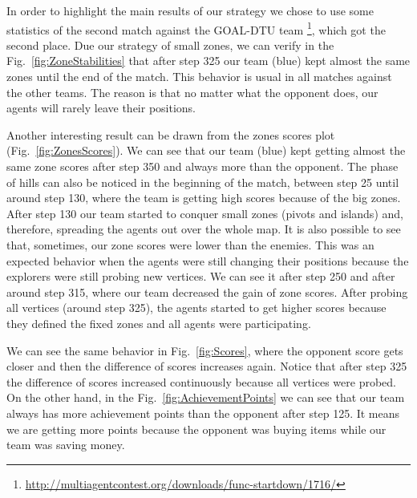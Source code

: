In order to highlight the main results of our strategy we chose to use some statistics of the second match against the GOAL-DTU team \footnote{\url{http://multiagentcontest.org/downloads/func-startdown/1716/}}, which got the second place. Due our strategy of small zones, we can verify in the Fig.~\ref{fig:ZoneStabilities}  that after step 325 our team (blue) kept almost the same zones until the end of the match. This behavior is usual in all matches against the other teams. The reason is that no matter what the opponent does, our agents will rarely leave their positions.

Another interesting result can be drawn from the zones scores plot (Fig.~\ref{fig:ZonesScores}). We can see that our team (blue) kept getting almost the same zone scores after step 350 and always more than the opponent. The phase of hills can also be noticed in the beginning of the match, between step 25 until around step 130, where the team is getting high scores because of the big zones. After step 130 our team started to conquer small zones (pivots and islands) and, therefore, spreading the agents out over the whole map. It is also possible to see that, sometimes, our zone scores were lower than the enemies. This was an expected behavior when the agents were still changing their positions because the explorers were still probing new vertices. We can see it after step 250 and after around step 315, where our team decreased the gain of zone scores. After probing all vertices (around step 325), the agents started to get higher scores because they defined the fixed zones and all agents were participating.

We can see the same behavior in Fig.~\ref{fig:Scores}, where the opponent score gets closer and then the difference of scores increases again. Notice that after step 325 the difference of scores increased continuously because all vertices were probed. On the other hand, in the Fig.~\ref{fig:AchievementPoints} we can see that our team always has more achievement points than the opponent after step 125. It means we are getting more points because the opponent was buying items while our team was saving money.